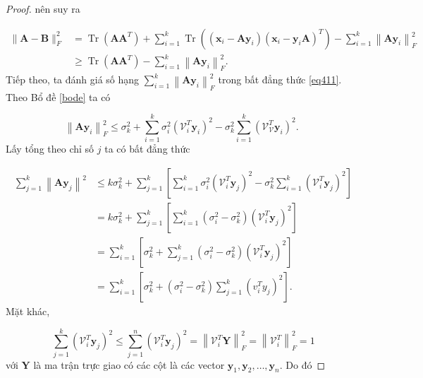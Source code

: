 \documentclass[12pt,a4paper,oneside]{report}
\numberwithin{equation}{section}
\begin{document}
\begin{proof}
nên suy ra

\begin{equation} \label{eq411}
\begin{aligned}
	\|\mathbf{A}-\mathbf{B}\|_{F}^{2} & =\operatorname{Tr}\left(\mathbf{A} \mathbf{A}^{T}\right)+\sum_{i=1}^{k} \operatorname{Tr}\left(\left(\mathbf{x}_{i}-\mathbf{A} \mathbf{y}_{i}\right)\left(\mathbf{x}_{i}-\mathbf{y}_{i} \mathbf{A}\right)^{T}\right)-\sum_{i=1}^{k}\left\|\mathbf{A y}_{i}\right\|_{F}^{2} \\
	& \geqslant \operatorname{Tr}\left(\mathbf{A} \mathbf{A}^{T}\right)-\sum_{i=1}^{k}\left\|\mathbf{A y}_{i}\right\|_{F}^{2} .
\end{aligned}
\end{equation}
Tiếp theo, ta đánh giá số hạng $\sum_{i=1}^{k}\left\|\mathbf{A y}_{i}\right\|_{F}^{2}$ trong bất đẳng thức \ref{eq411}. Theo Bổ đề \ref{bode} ta có

$$
\left\|\mathbf{A y}_{i}\right\|_{F}^{2} \leqslant \sigma_{k}^{2}+\sum_{i=1}^{k} \sigma_{i}^{2}\left(\mathcal{V}_{i}^{T} \mathbf{y}_{i}\right)^{2}-\sigma_{k}^{2} \sum_{i=1}^{k}\left(\mathcal{V}_{\mathcal{V}}^{T} \mathbf{y}_{i}\right)^{2} \text {. }
$$
Lấy tổng theo chỉ số $j$ ta có bất đẳng thức

$$
\begin{aligned}
	\sum_{j=1}^{k}\left\|\mathbf{A y}_{j}\right\|^{2} & \leqslant k \sigma_{k}^{2}+\sum_{j=1}^{k}\left[\sum_{i=1}^{k} \sigma_{i}^{2}\left(\mathcal{V}_{i}^{T} \mathbf{y}_{j}\right)^{2}-\sigma_{k}^{2} \sum_{i=1}^{k}\left(\mathcal{V}_{i}^{T} \mathbf{y}_{j}\right)^{2}\right] \\
	& =k \sigma_{k}^{2}+\sum_{j=1}^{k}\left[\sum_{i=1}^{k}\left(\sigma_{i}^{2}-\sigma_{k}^{2}\right)\left(\mathcal{V}_{i}^{T} \mathbf{y}_{j}\right)^{2}\right] \\
	& =\sum_{i=1}^{k}\left[\sigma_{k}^{2}+\sum_{j=1}^{k}\left(\sigma_{i}^{2}-\sigma_{k}^{2}\right)\left(\mathcal{V}_{i}^{T} \mathbf{y}_{j}\right)^{2}\right] \\
	& =\sum_{i=1}^{k}\left[\sigma_{k}^{2}+\left(\sigma_{i}^{2}-\sigma_{k}^{2}\right) \sum_{j=1}^{k}\left(v_{i}^{T} y_{j}\right)^{2}\right] .
\end{aligned}
$$
Mặt khác,

$$
\sum_{j=1}^{k}\left(\mathcal{V}_{i}^{T} \mathbf{y}_{j}\right)^{2} \leqslant \sum_{j=1}^{n}\left(\mathcal{V}_{i}^{T} \mathbf{y}_{j}\right)^{2}=\left\|\mathcal{V}_{i}^{T} \mathbf{Y}\right\|_{F}^{2}=\left\|\mathcal{V}_{i}^{T}\right\|_{F}^{2}=1
$$
với $\mathbf{Y}$ là ma trận trực giao có các cột là các vector $\mathbf{y}_{1}, \mathbf{y}_{2}, \ldots, \mathbf{y}_{n}$. Do đó


\end{proof}
\end{document}
